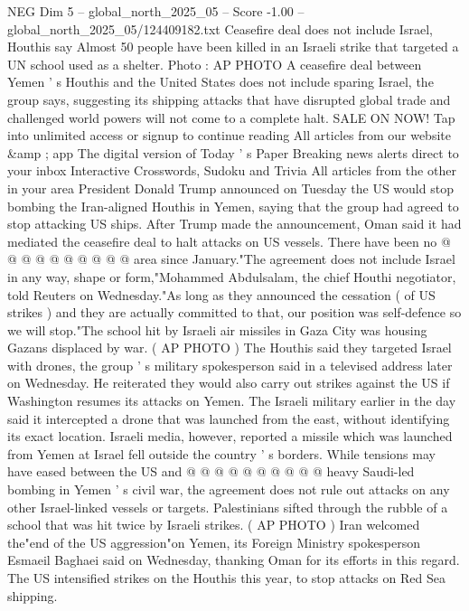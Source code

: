 \begin{textsample}{NEG Dim 5 – global\_north\_2025\_05 – Score -1.00 – global\_north\_2025\_05/124409182.txt}  \label{ex:f5_neg_328}
Ceasefire deal does not include Israel, Houthis say Almost 50 people have been killed in an Israeli strike that targeted a UN school used as a shelter.
Photo : AP PHOTO A ceasefire deal between Yemen ' s Houthis and the United States does not include sparing Israel, the group says, suggesting its shipping attacks that have disrupted global trade and challenged world powers will not come to a complete halt.
SALE ON NOW!
Tap into unlimited access or signup to continue reading All articles from our website \&amp ; app The digital version of Today ' s Paper Breaking news alerts direct to your inbox Interactive Crosswords, Sudoku and Trivia All articles from the other in your area President Donald Trump announced on Tuesday the US would stop bombing the Iran-aligned Houthis in Yemen, saying that the group had agreed to stop attacking US ships.
After Trump made the announcement, Oman said it had mediated the ceasefire deal to halt attacks on US vessels.
There have been no @ @ @ @ @ @ @ @ @ @ area since January."The agreement does not include Israel in any way, shape or form,"Mohammed Abdulsalam, the chief Houthi negotiator, told Reuters on Wednesday."As long as they announced the cessation ( of US strikes ) and they are actually committed to that, our position was self-defence so we will stop."The school hit by Israeli air missiles in Gaza City was housing Gazans displaced by war. ( AP PHOTO ) The Houthis said they targeted Israel with drones, the group ' s military spokesperson said in a televised address later on Wednesday.
He reiterated they would also carry out strikes against the US if Washington resumes its attacks on Yemen.
The Israeli military earlier in the day said it intercepted a drone that was launched from the east, without identifying its exact location.
Israeli media, however, reported a missile which was launched from Yemen at Israel fell outside the country ' s borders.
While tensions may have eased between the US and @ @ @ @ @ @ @ @ @ @ heavy Saudi-led bombing in Yemen ' s civil war, the agreement does not rule out attacks on any other Israel-linked vessels or targets.
Palestinians sifted through the rubble of a school that was hit twice by Israeli strikes. ( AP PHOTO ) Iran welcomed the"end of the US aggression"on Yemen, its Foreign Ministry spokesperson Esmaeil Baghaei said on Wednesday, thanking Oman for its efforts in this regard.
The US intensified strikes on the Houthis this year, to stop attacks on Red Sea shipping.

\end{textsample}
